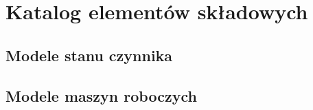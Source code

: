 \section{Katalog elementów składowych}

\subsection{Modele stanu czynnika}





\subsection{Modele maszyn roboczych}

\newcommand\wykresTs[2][]{
	\subfloat[][Wykres T-s przemiany]{
		\begin{tikzpicture}
			\begin{axis}[
				xtick=\empty,
				ytick=\empty,
				axis lines=left,
				ylabel=T,
				xlabel=s,
				height=5cm,
				clip=false,
				every axis x label/.style={at={(xticklabel cs:.95,.2cm)}},
				every axis y label/.style={at={(yticklabel cs:.9,.2cm)}},
				#1
			]
				\addplot+[no marks, smooth] table[x=s, y=T] {wykresy/_nasyc.txt};
				#2
			\end{axis}
		\end{tikzpicture}
	}
}





